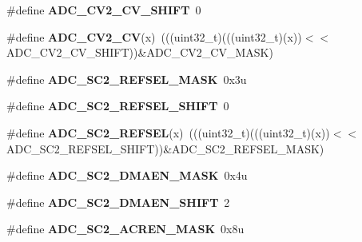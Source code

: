 \begin{DoxyCompactItemize}
\item 
\#define {\bfseries A\+D\+C\+\_\+\+C\+V2\+\_\+\+C\+V\+\_\+\+S\+H\+I\+FT}~0\hypertarget{group__ADC__Register__Masks_ga5ecccc775bd06291531df6e989024d38}{}\label{group__ADC__Register__Masks_ga5ecccc775bd06291531df6e989024d38}

\item 
\#define {\bfseries A\+D\+C\+\_\+\+C\+V2\+\_\+\+CV}(x)~(((uint32\+\_\+t)(((uint32\+\_\+t)(x))$<$$<$A\+D\+C\+\_\+\+C\+V2\+\_\+\+C\+V\+\_\+\+S\+H\+I\+FT))\&A\+D\+C\+\_\+\+C\+V2\+\_\+\+C\+V\+\_\+\+M\+A\+SK)\hypertarget{group__ADC__Register__Masks_gaa4d71a13e422a14048307c0acab90841}{}\label{group__ADC__Register__Masks_gaa4d71a13e422a14048307c0acab90841}

\item 
\#define {\bfseries A\+D\+C\+\_\+\+S\+C2\+\_\+\+R\+E\+F\+S\+E\+L\+\_\+\+M\+A\+SK}~0x3u\hypertarget{group__ADC__Register__Masks_gaa821d1e2e4575c757e9446da61b2230a}{}\label{group__ADC__Register__Masks_gaa821d1e2e4575c757e9446da61b2230a}

\item 
\#define {\bfseries A\+D\+C\+\_\+\+S\+C2\+\_\+\+R\+E\+F\+S\+E\+L\+\_\+\+S\+H\+I\+FT}~0\hypertarget{group__ADC__Register__Masks_gaab9b293eb54de2d9d246766002e44556}{}\label{group__ADC__Register__Masks_gaab9b293eb54de2d9d246766002e44556}

\item 
\#define {\bfseries A\+D\+C\+\_\+\+S\+C2\+\_\+\+R\+E\+F\+S\+EL}(x)~(((uint32\+\_\+t)(((uint32\+\_\+t)(x))$<$$<$A\+D\+C\+\_\+\+S\+C2\+\_\+\+R\+E\+F\+S\+E\+L\+\_\+\+S\+H\+I\+FT))\&A\+D\+C\+\_\+\+S\+C2\+\_\+\+R\+E\+F\+S\+E\+L\+\_\+\+M\+A\+SK)\hypertarget{group__ADC__Register__Masks_gacac3b41d5c2bb74a8c614f200f0c0a36}{}\label{group__ADC__Register__Masks_gacac3b41d5c2bb74a8c614f200f0c0a36}

\item 
\#define {\bfseries A\+D\+C\+\_\+\+S\+C2\+\_\+\+D\+M\+A\+E\+N\+\_\+\+M\+A\+SK}~0x4u\hypertarget{group__ADC__Register__Masks_ga50fc5fed4844c3ceb8da9b595029da11}{}\label{group__ADC__Register__Masks_ga50fc5fed4844c3ceb8da9b595029da11}

\item 
\#define {\bfseries A\+D\+C\+\_\+\+S\+C2\+\_\+\+D\+M\+A\+E\+N\+\_\+\+S\+H\+I\+FT}~2\hypertarget{group__ADC__Register__Masks_ga5554f538c0c6d7b3e2dfa502fdfed488}{}\label{group__ADC__Register__Masks_ga5554f538c0c6d7b3e2dfa502fdfed488}

\item 
\#define {\bfseries A\+D\+C\+\_\+\+S\+C2\+\_\+\+A\+C\+R\+E\+N\+\_\+\+M\+A\+SK}~0x8u\hypertarget{group__ADC__Register__Masks_ga25f7f0c6a6513cbfbd4684513b373f9c}{}\label{group__ADC__Register__Masks_ga25f7f0c6a6513cbfbd4684513b373f9c}


\end{DoxyCompactItemize}
